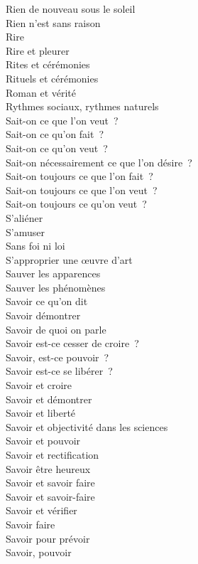 \documentclass[a4paper,12pt]{article}
\begin{document}
Rien de nouveau sous le soleil \\
Rien n'est sans raison \\
Rire \\
Rire et pleurer \\
Rites et cérémonies \\
Rituels et cérémonies \\
Roman et vérité \\
Rythmes sociaux, rythmes naturels \\
Sait-on ce que l'on veut ? \\
Sait-on ce qu'on fait ? \\
Sait-on ce qu'on veut ? \\
Sait-on nécessairement ce que l'on désire ? \\
Sait-on toujours ce que l'on fait ? \\
Sait-on toujours ce que l'on veut ? \\
Sait-on toujours ce qu'on veut ? \\
S'aliéner \\
S'amuser \\
Sans foi ni loi \\
S'approprier une œuvre d'art \\
Sauver les apparences \\
Sauver les phénomènes \\
Savoir ce qu'on dit \\
Savoir démontrer \\
Savoir de quoi on parle \\
Savoir est-ce cesser de croire ? \\
Savoir, est-ce pouvoir ? \\
Savoir est-ce se libérer ? \\
Savoir et croire \\
Savoir et démontrer \\
Savoir et liberté \\
Savoir et objectivité dans les sciences \\
Savoir et pouvoir \\
Savoir et rectification \\
Savoir être heureux \\
Savoir et savoir faire \\
Savoir et savoir-faire \\
Savoir et vérifier \\
Savoir faire \\
Savoir pour prévoir \\
Savoir, pouvoir \\
\end{document}
